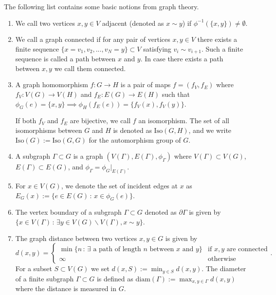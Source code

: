 \documentclass{article}
\newcommand{\Iso}{\mathrm{Iso}}
\newcommand{\diam}{\mathrm{diam}}
\begin{document}
The following list contains some basic notions from graph theory.
\begin{enumerate}
    \item[i)] We call two vertices $x,y\in V$ adjacent (denoted as $x\sim y$) if $\phi^{-1}(\{x,y\})\neq\emptyset$.
    \item[ii)] We call a graph connected if for any pair of vertices $x,y\in V$ there exists a finite sequence $\{x=v_1,v_2,...,v_N=y\}\subset V$ satisfying $v_i\sim v_{i+1}$. Such a finite sequence is called a path between $x$ and $y$. In case there exists a path between $x,y$ we call them connected.
    \item[iii)] A graph homomorphism $f:G\to H$ is a pair of maps $f = (f_V, f_E)$ where $f_V:V(G)\to V(H)$ and $f_E:E(G)\to E(H)$ such that $\phi_G(e)=\{x,y\}\implies\phi_H(f_E(e))=\{f_V(x),f_V(y)\}$.
    
    If both $f_V$ and $f_E$ are bijective, we call $f$ an isomorphism. The set of all isomorphisms between $G$ and $H$ is denoted as $\Iso(G,H)$, and we write $\Iso(G):=\Iso(G,G)$ for the automorphism group of $G$.
    \item[iv)] A subgraph $\Gamma\subset G$ is a graph $(V(\Gamma), E(\Gamma), \phi_\Gamma)$ where $V(\Gamma)\subset V(G)$, $E(\Gamma)\subset E(G)$, and $\phi_\Gamma = \phi_G\big|_{E(\Gamma)}$.
    \item[v)] For $x\in V(G)$, we denote the set of incident edges at $x$ as $E_G(x):=\{e\in E(G)\,:\,x \in \phi_G(e)\}$.
    \item[vi)] The vertex boundary of a subgraph $\Gamma\subset G$ denoted as $\partial\Gamma$ is given by $\{x\in V(\Gamma)\,:\,\exists y\in V(G)\backslash V(\Gamma),x\sim y\}$.
    \item[vii)] The graph distance between two vertices $x,y\in G$ is given by
    \begin{equation}
        d(x,y)=\begin{cases}\min\{n\,:\,\exists\,\,\mathrm{a\,\,path\,\,of\,\,length}\,\,n\,\,\mathrm{between}\,\,x\,\,\mathrm{and}\,\,y\}&\mathrm{if}\,\,x,y\,\,\mathrm{are\,\,connected}\\
        \infty&\mathrm{otherwise}
        \end{cases}.
    \end{equation}
    For a subset $S\subset V(G)$ we set $d(x,S):=\min_{y\in S}d(x,y)$. The diameter of a finite subgraph $\Gamma\subset G$ is defined as $\diam(\Gamma):=\max_{x,y\in\Gamma}d(x,y)$ where the distance is measured in $G$.
\end{enumerate}
\end{document}
